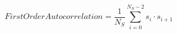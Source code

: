 \begin{displaymath}
\mathit{FirstOrderAutocorrelation} = \frac{1}{N_S} \sum_{i=0}^{N_S-2} s_i \cdot s_{i+1}
\label{eq:first_order_autocorrelation}
\end{displaymath}
